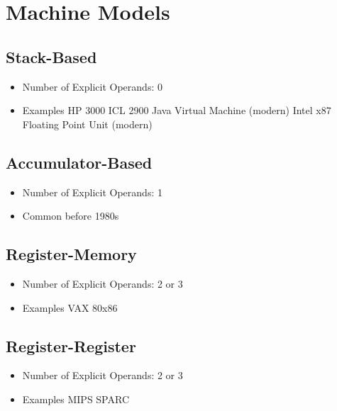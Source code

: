 \documentclass[9pt,twocolumn]{article}
\begin{document}
\section*{Machine Models}
  \subsection*{Stack-Based}
    \begin{itemize}
      \item Number of Explicit Operands: 0
      \item Examples
        \subitem HP 3000
        \subitem ICL 2900
        \subitem Java Virtual Machine (modern)
        \subitem Intel x87 Floating Point Unit (modern)
    \end{itemize}
  \subsection*{Accumulator-Based}
    \begin{itemize}
      \item Number of Explicit Operands: 1
      \item Common before 1980s
    \end{itemize}
  \subsection*{Register-Memory}
    \begin{itemize}
      \item Number of Explicit Operands: 2 or 3
      \item Examples
        \subitem VAX
        \subitem 80x86
    \end{itemize}
  \subsection*{Register-Register}
    \begin{itemize}
      \item Number of Explicit Operands: 2 or 3
      \item Examples
        \subitem MIPS
        \subitem SPARC
    \end{itemize}
\end{document}
